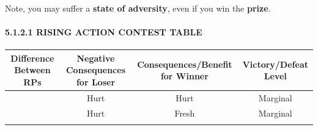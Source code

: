 \documentclass[
]{article}
\begin{document}
Note, you may suffer a \textbf{state of adversity}, even if you win the
\textbf{prize}.

\hypertarget{rising-action-contest-table}{%
\paragraph{5.1.2.1 RISING ACTION CONTEST
TABLE}\label{rising-action-contest-table}}

\begin{longtable}[]{@{}cccc@{}}
\toprule
\begin{minipage}[b]{0.19\columnwidth}\centering
Difference Between RPs\strut
\end{minipage} & \begin{minipage}[b]{0.26\columnwidth}\centering
Negative Consequences for Loser\strut
\end{minipage} & \begin{minipage}[b]{0.26\columnwidth}\centering
Consequences/Benefit for Winner\strut
\end{minipage} & \begin{minipage}[b]{0.17\columnwidth}\centering
Victory/Defeat Level\strut
\end{minipage}\tabularnewline
\midrule
\endhead
\begin{minipage}[t]{0.19\columnwidth}\centering
1\strut
\end{minipage} & \begin{minipage}[t]{0.26\columnwidth}\centering
Hurt\strut
\end{minipage} & \begin{minipage}[t]{0.26\columnwidth}\centering
Hurt\strut
\end{minipage} & \begin{minipage}[t]{0.17\columnwidth}\centering
Marginal\strut
\end{minipage}\tabularnewline
\begin{minipage}[t]{0.19\columnwidth}\centering
2\strut
\end{minipage} & \begin{minipage}[t]{0.26\columnwidth}\centering
Hurt\strut
\end{minipage} & \begin{minipage}[t]{0.26\columnwidth}\centering
Fresh\strut
\end{minipage} & \begin{minipage}[t]{0.17\columnwidth}\centering
Marginal\strut
\end{minipage}\tabularnewline
\begin{minipage}[t]{0.19\columnwidth}\centering

\end{minipage}
\end{longtable}
\end{document}
